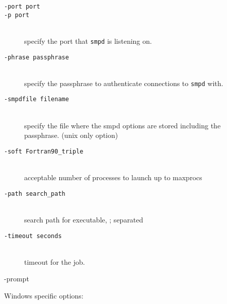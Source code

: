 \documentclass[dvipdfm,11pt]{article}
\begin{document}
\begin{description}
\item[\texttt{-port port}]
\item[\texttt{-p port}]\mbox{}\\
  specify the port that \texttt{smpd} is listening on.
\item[\texttt{-phrase passphrase}]\mbox{}\\
  specify the passphrase to authenticate connections to \texttt{smpd} with.
\item[\texttt{-smpdfile filename}]\mbox{}\\
  specify the file where the smpd options are stored including the 
passphrase. (unix only option)
\item[\texttt{-soft Fortran90\_triple}]\mbox{}\\
  acceptable number of processes to launch up to maxprocs
\item[\texttt{-path search\_path}]\mbox{}\\
  search path for executable, ; separated
\item[\texttt{-timeout seconds}]\mbox{}\\
  timeout for the job.
\item[-prompt] 
\end{description}
Windows specific options:
\end{document}
